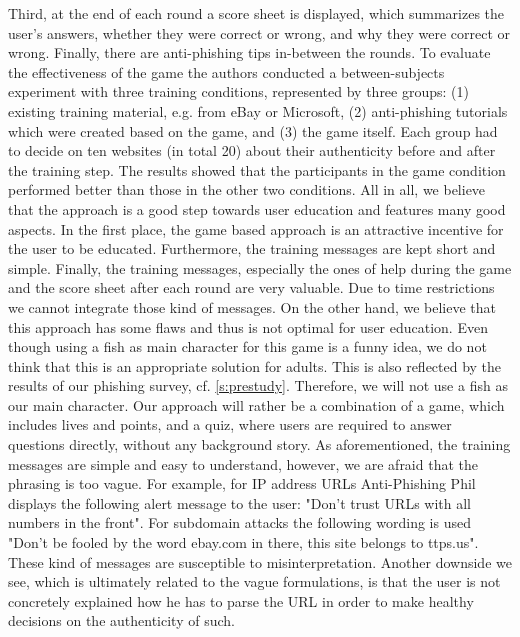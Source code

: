 Third, at the end of each round a score sheet is displayed, which summarizes the user's answers, whether they were correct or wrong, and why they were correct or wrong. 
Finally, there are anti-phishing tips in-between the rounds. \newline
To evaluate the effectiveness of the game the authors conducted a between-subjects experiment with three training conditions, represented by three groups: 
(1) existing training material, e.g. from eBay or Microsoft, (2) anti-phishing tutorials which were created based on the game, and (3) the game itself. 
Each group had to decide on ten websites (in total 20) about their authenticity before and after the training step. 
The results showed that the participants in the game condition performed better than those in the other two conditions. 
All in all, we believe that the approach is a good step towards user education and features many good aspects. 
In the first place, the game based approach is an attractive incentive for the user to be educated. 
Furthermore, the training messages are kept short and simple. 
Finally, the training messages, especially the ones of help during the game and the score sheet after each round are very valuable. 
Due to time restrictions we cannot integrate those kind of messages. \newline
On the other hand, we believe that this approach has some flaws and thus is not optimal for user education. 
Even though using a fish as main character for this game is a funny idea, we do not think that this is an appropriate solution for adults. 
This is also reflected by the results of our phishing survey, cf. \autoref{s:prestudy}. 
Therefore, we will not use a fish as our main character. 
Our approach will rather be a combination of a game, which includes lives and points, and a quiz, where users are required to answer questions directly, without any background story.
As aforementioned, the training messages are simple and easy to understand, however, we are afraid that the phrasing is too vague. 
For example, for IP address URLs Anti-Phishing Phil displays the following alert message to the user: 
"Don't trust URLs with all numbers in the front". 
For subdomain attacks the following wording is used "Don't be fooled by the word ebay.com in there, this site belongs to ttps.us". 
These kind of messages are susceptible to misinterpretation. 
Another downside we see, which is ultimately related to the vague formulations, is that the user is not concretely explained how he has to parse the URL in order to make healthy decisions on the authenticity of such. 
